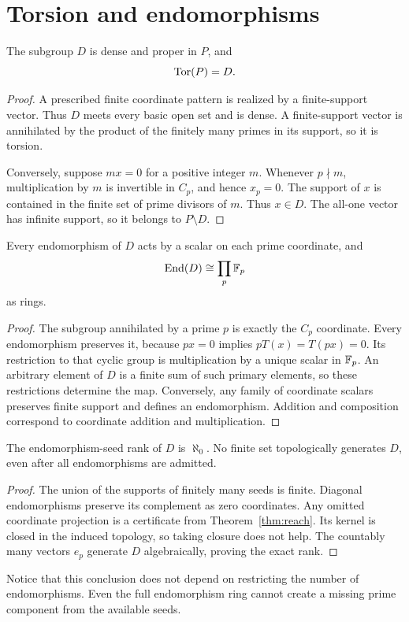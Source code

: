 \section{Torsion and endomorphisms}
\begin{theorem}
\label{thm:torP}
The subgroup $D$ is dense and proper in $P$, and
\[
\operatorname{Tor}(P)=D.
\]
\end{theorem}
\begin{proof}
A prescribed finite coordinate pattern is realized by a finite-support vector. Thus $D$ meets every basic open set and is dense. A finite-support vector is annihilated by the product of the finitely many primes in its support, so it is torsion.

Conversely, suppose $mx=0$ for a positive integer $m$. Whenever $p\nmid m$, multiplication by $m$ is invertible in $C_p$, and hence $x_p=0$. The support of $x$ is contained in the finite set of prime divisors of $m$. Thus $x\in D$. The all-one vector has infinite support, so it belongs to $P\setminus D$.
\end{proof}

\begin{proposition}
\label{thm:endD}
Every endomorphism of $D$ acts by a scalar on each prime coordinate, and
\[
\operatorname{End}(D)\cong\prod_p\mathbb F_p
\]
as rings.
\end{proposition}
\begin{proof}
The subgroup annihilated by a prime $p$ is exactly the $C_p$ coordinate. Every endomorphism preserves it, because $px=0$ implies $pT(x)=T(px)=0$. Its restriction to that cyclic group is multiplication by a unique scalar in $\mathbb F_p$. An arbitrary element of $D$ is a finite sum of such primary elements, so these restrictions determine the map. Conversely, any family of coordinate scalars preserves finite support and defines an endomorphism. Addition and composition correspond to coordinate addition and multiplication.
\end{proof}

\begin{corollary}
\label{thm:rankD}
The endomorphism-seed rank of $D$ is $\aleph_0$. No finite set topologically generates $D$, even after all endomorphisms are admitted.
\end{corollary}
\begin{proof}
The union of the supports of finitely many seeds is finite. Diagonal endomorphisms preserve its complement as zero coordinates. Any omitted coordinate projection is a certificate from Theorem~\ref{thm:reach}. Its kernel is closed in the induced topology, so taking closure does not help. The countably many vectors $e_p$ generate $D$ algebraically, proving the exact rank.
\end{proof}
Notice that this conclusion does not depend on restricting the number of endomorphisms. Even the full endomorphism ring cannot create a missing prime component from the available seeds.


